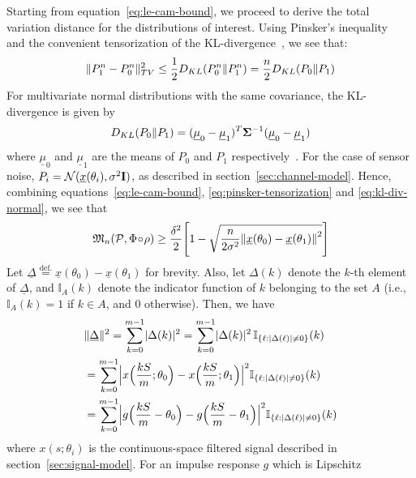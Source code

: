 \documentclass[conference]{IEEEtran}
\providecommand{\v}{}
\renewcommand{\v}[1]{\underline{#1}}
\providecommand{\m}{}
\renewcommand{\m}[1]{{\bf #1}}
\DeclarePairedDelimiter\abs{\lvert}{\rvert}
\DeclarePairedDelimiter\norm{\lVert}{\rVert}
\newcommand{\Phiorho}{\Phi\!\circ\!\rho}
\begin{document}
\begin{IEEEproof}
Starting from equation~\eqref{eq:le-cam-bound}, we proceed to derive the total
variation distance for the distributions of interest. Using Pinsker's
inequality~\cite{Kullback1967Lower} and the convenient tensorization of the
KL-divergence~\cite{Duchi2015Information}, we see that:
\begin{equation} \label{eq:pinsker-tensorization}
	\norm{P_1^n - P_0^n}_{TV}^2 \leq \frac{1}{2} D_{KL}(P_0^n \Vert P_1^n) = \frac{n}{2} D_{KL}(P_0 \Vert P_1)
\end{equation}
For multivariate normal distributions with the same covariance, the
KL-divergence is given by
\begin{equation} \label{eq:kl-div-normal}
	D_{KL}(P_0 \Vert P_1) = (\v \mu_0 - \v \mu_1)^T \m \Sigma^{-1} (\v \mu_0 - \v \mu_1)
\end{equation}
where $\v \mu_0$ and $\v \mu_1$ are the means of $P_0$ and $P_1$
respectively~\cite{DuchiDerivation}. For the case of sensor noise, $P_i =
\mathcal{N}(\v x(\theta_i), \sigma^2 \m I)$, as described in
section~\ref{sec:channel-model}. Hence, combining
equations~\eqref{eq:le-cam-bound}, \eqref{eq:pinsker-tensorization} and
\eqref{eq:kl-div-normal}, we see that
\begin{equation} \label{eq:lb-after-pinsker}
	\mathfrak{M}_n(\mathcal{P}, \Phiorho) \geq \frac{\delta^2}{2} \Bigg[ 1 - \sqrt{ \frac{n}{2\sigma^2} \norm*{\v x(\theta_0) - \v x(\theta_1)}^2 } \Bigg]
\end{equation}
Let $\v \Delta \overset{\text{def.}}{=} \v x(\theta_0) - \v x(\theta_1)$ for
brevity. Also, let $\Delta(k)$ denote the $k$-th element of $\v\Delta$, and
$\mathbb I_A(k)$ denote the indicator function of $k$ belonging to the set $A$
(i.e., $\mathbb I_A(k) = 1$ if $k \in A$, and $0$ otherwise). Then, we have
\begin{align}
	&\norm{\v\Delta}^2 = \sum_{k=0}^{m-1} \abs{\Delta(k)}^2 = \sum_{k=0}^{m-1} \abs{\Delta(k)}^2 \, \mathbb I_{\{\ell: \abs{\Delta(\ell)} \neq 0\}}(k) \\
	&= \sum_{k=0}^{m-1} \abs[\Big]{x\Big(\frac{kS}{m}; \theta_0\Big) - x\Big(\frac{kS}{m}; \theta_1\Big)}^2 \mathbb I_{\{\ell: \abs{\Delta(\ell)} \neq 0\}}(k) \\
	&= \sum_{k=0}^{m-1} \abs[\Big]{g\Big(\frac{kS}{m} - \theta_0\Big) - g\Big(\frac{kS}{m} - \theta_1\Big)}^2 \mathbb I_{\{\ell: \abs{\Delta(\ell)} \neq 0\}}(k)
\end{align}
where $x(s;\theta_i)$ is the continuous-space filtered signal described in
section~\ref{sec:signal-model}. For an impulse response $g$ which is Lipschitz

\end{IEEEproof}
\end{document}
